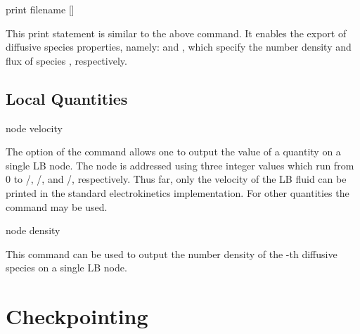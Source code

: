 \begin{essyntax}
  print 
  filename []
  \begin{features}
  \end{features}
\end{essyntax}
This print statement is similar to the above command. It enables the export of
diffusive species properties, namely:  and , which 
specify the number density and flux of species ,
respectively.

\subsection{\label{ssec:ek-local-quantities}Local Quantities}

\begin{essyntax}
  node    
  velocity
  \begin{features}
  \end{features}
\end{essyntax}
The  option of the  command allows one to output 
the value of a quantity on a single LB node. The node is addressed using three
integer values which run from 0 to /,
/, and /, respectively. Thus far,
only the velocity of the LB fluid can be printed in the standard electrokinetics
implementation. For other quantities the  command may be used. 

\begin{essyntax}
  node   
  density
  \begin{features}
  \end{features}
\end{essyntax}
This command can be used to output the number density of the
-th diffusive species on a single LB node.

\section{\label{ssec:ek-checkpointing}Checkpointing}

